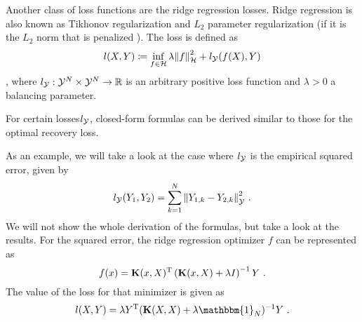 Another class of loss functions are the ridge regression losses.
Ridge regression is also known as Tikhonov regularization and $L_2$ parameter regularization (if it is the $L_2$ norm that is penalized \cite{goodfellow16}).
The loss is defined as
\begin{equation}
	\label{eq:ridge-regression-loss}
	l(X, Y) \coloneqq \inf_{f \in \mathcal{H}} \lambda \norm{f}_\mathcal{H}^2 
	+ l_{\mathcal{Y}} (f(X), Y)
\end{equation},
where $l_{\mathcal{Y}}: \mathcal{Y}^N \times \mathcal{Y}^N \rightarrow \mathbb{R}$ is an arbitrary positive loss function and $\lambda > 0$ a balancing parameter.

For certain losses$l_{\mathcal{Y}}$,  closed-form formulas can be derived similar to those for the optimal recovery loss.

As an example, we will take a look at the case where $l_{\mathcal{Y}}$ is the empirical squared error, given by
\begin{equation}
	l_{\mathcal{Y}}(Y_1, Y_2) = \sum_{k=1}^{N} \norm{Y_{1, k} - Y_{2, k}}_{\mathcal{Y}}^2 \ .
\end{equation} 
We will not show the whole derivation of the formulas, but take a look at the results.
For the squared error, the ridge regression optimizer $f$ can be represented as
\begin{equation}
	\label{eq:ridge-regression-f}
	f(x) = \mathbf{K}(x, X)^{\mathrm{T}} \left(\mathbf{K}(x, X) + \lambda I\right)^{-1}Y \ .
\end{equation}
The value of the loss for that minimizer is given as
\begin{equation}
	\label{eq:ridge-regression-loss-se-closed-form}
	l(X, Y) = \lambda Y^\T (\mathbf{K}(X, X) + \lambda \mathbbm{1}_N)^{-1} Y \ .
\end{equation}